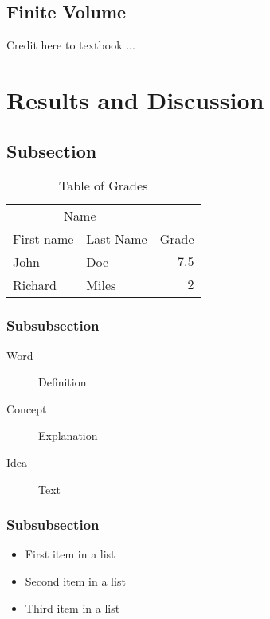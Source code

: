 \documentclass[fleqn,10pt]{SelfArx} %
\begin{document}
\subsection{Finite Volume}

Credit here to textbook ...



\section{Results and Discussion}

\lipsum[5] %

\subsection{Subsection}

\lipsum[6] %

\begin{table}[hbt]
	\caption{Table of Grades}
	\centering
	\begin{tabular}{llr}
		\toprule
		\multicolumn{2}{c}{Name} \\
		\cmidrule(r){1-2}
		First name & Last Name & Grade \\
		\midrule
		John & Doe & $7.5$ \\
		Richard & Miles & $2$ \\
		\bottomrule
	\end{tabular}
	\label{tab:label}
\end{table}

\subsubsection{Subsubsection}

\lipsum[7] %

\begin{description}
	\item[Word] Definition
	\item[Concept] Explanation
	\item[Idea] Text
\end{description}

\subsubsection{Subsubsection}

\lipsum[8] %

\begin{itemize}[noitemsep] %
	\item First item in a list
	\item Second item in a list
	\item Third item in a list
\end{itemize}
\end{document}
